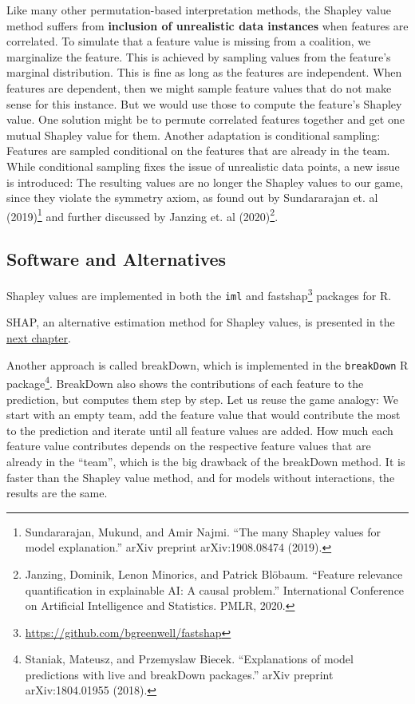 \documentclass[
  12pt,
]{krantz}
\renewcommand{\href}[2]{#2\footnote{\url{#1}}}
\begin{document}
Like many other permutation-based interpretation methods, the Shapley value method suffers from \textbf{inclusion of unrealistic data instances} when features are correlated.
To simulate that a feature value is missing from a coalition, we marginalize the feature.
This is achieved by sampling values from the feature's marginal distribution.
This is fine as long as the features are independent.
When features are dependent, then we might sample feature values that do not make sense for this instance.
But we would use those to compute the feature's Shapley value.
One solution might be to permute correlated features together and get one mutual Shapley value for them.
Another adaptation is conditional sampling: Features are sampled conditional on the features that are already in the team.
While conditional sampling fixes the issue of unrealistic data points, a new issue is introduced:
The resulting values are no longer the Shapley values to our game, since they violate the symmetry axiom, as found out by Sundararajan et. al (2019)\footnote{Sundararajan, Mukund, and Amir Najmi. ``The many Shapley values for model explanation.'' arXiv preprint arXiv:1908.08474 (2019).} and further discussed by Janzing et. al (2020)\footnote{Janzing, Dominik, Lenon Minorics, and Patrick Blöbaum. ``Feature relevance quantification in explainable AI: A causal problem.'' International Conference on Artificial Intelligence and Statistics. PMLR, 2020.}.

\hypertarget{software-and-alternatives-5}{%
\subsection{Software and Alternatives}\label{software-and-alternatives-5}}

Shapley values are implemented in both the \texttt{iml} and \href{https://github.com/bgreenwell/fastshap}{fastshap} packages for R.

SHAP, an alternative estimation method for Shapley values, is presented in the \protect\hyperlink{shap}{next chapter}.

Another approach is called breakDown, which is implemented in the \texttt{breakDown} R package\footnote{Staniak, Mateusz, and Przemyslaw Biecek. ``Explanations of model predictions with live and breakDown packages.'' arXiv preprint arXiv:1804.01955 (2018).}.
BreakDown also shows the contributions of each feature to the prediction, but computes them step by step.
Let us reuse the game analogy:
We start with an empty team, add the feature value that would contribute the most to the prediction and iterate until all feature values are added.
How much each feature value contributes depends on the respective feature values that are already in the ``team'', which is the big drawback of the breakDown method.
It is faster than the Shapley value method, and for models without interactions, the results are the same.
\end{document}
